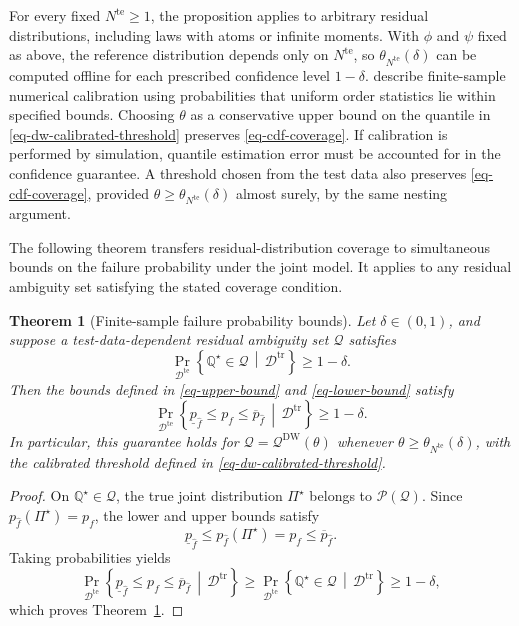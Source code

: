 \documentclass[review,11pt,3p,authoryear,nopreprintline]{elsarticle}
\newtheorem{theorem}{Theorem}
\begin{document}
For every fixed $N^{\mathrm{te}}\ge1$, the proposition applies to arbitrary residual distributions, including laws with atoms or infinite moments. With $\phi$ and $\psi$ fixed as above, the reference distribution depends only on $N^{\mathrm{te}}$, so $\theta_{N^{\mathrm{te}}}(\delta)$ can be computed offline for each prescribed confidence level $1-\delta$. \citet[Supplement, Sections~S.6--S.7]{L.J23} describe finite-sample numerical calibration using probabilities that uniform order statistics lie within specified bounds. Choosing $\theta$ as a conservative upper bound on the quantile in \eqref{eq-dw-calibrated-threshold} preserves \eqref{eq-cdf-coverage}. If calibration is performed by simulation, quantile estimation error must be accounted for in the confidence guarantee. A threshold chosen from the test data also preserves \eqref{eq-cdf-coverage}, provided $\theta\ge\theta_{N^{\mathrm{te}}}(\delta)$ almost surely, by the same nesting argument.

The following theorem transfers residual-distribution coverage to simultaneous bounds on the failure probability under the joint model. It applies to any residual ambiguity set satisfying the stated coverage condition.

\begin{theorem}[Finite-sample failure probability bounds]
  \label{theorem-01}
  Let $\delta\in(0,1)$, and suppose a test-data-dependent residual ambiguity set $\mathscr Q$ satisfies
  \[
    \Pr_{\mathcal D^{\mathrm{te}}}\left\{\mathbb Q^\star\in\mathscr Q\,\middle|\,\mathcal D^{\mathrm{tr}}\right\}\ge1-\delta.
  \]
  Then the bounds defined in \eqref{eq-upper-bound} and \eqref{eq-lower-bound} satisfy
  \begin{equation}
    \Pr_{\mathcal D^{\mathrm{te}}}\left\{\underline p_{\hat f}\le p_f\le\overline p_{\hat f}\,\middle|\,\mathcal D^{\mathrm{tr}}\right\}\ge1-\delta.
    \label{eq-failure-probability-coverage}
  \end{equation}
  In particular, this guarantee holds for $\mathscr Q=\mathscr Q^{\mathrm{DW}}(\theta)$ whenever $\theta\ge\theta_{N^{\mathrm{te}}}(\delta)$, with the calibrated threshold defined in \eqref{eq-dw-calibrated-threshold}.
\end{theorem}
\begin{proof}
  On $\mathbb Q^\star\in\mathscr Q$, the true joint distribution $\Pi^\star$ belongs to $\mathscr P(\mathscr Q)$. Since $p_{\hat f}(\Pi^\star)=p_f$, the lower and upper bounds satisfy
  \[
    \underline p_{\hat f}\le p_{\hat f}(\Pi^\star)=p_f\le\overline p_{\hat f}.
  \]
  Taking probabilities yields
  \[
    \Pr_{\mathcal D^{\mathrm{te}}}\left\{\underline p_{\hat f}\le p_f\le\overline p_{\hat f}\,\middle|\,\mathcal D^{\mathrm{tr}}\right\}\ge\Pr_{\mathcal D^{\mathrm{te}}}\left\{\mathbb Q^\star\in\mathscr Q\,\middle|\,\mathcal D^{\mathrm{tr}}\right\}\ge1-\delta,
  \]
  which proves Theorem~\ref{theorem-01}.
\end{proof}
\end{document}
